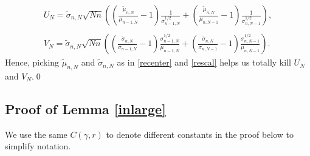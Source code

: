 \documentclass[11pt]{article}
\numberwithin{equation}{section}%
\numberwithin{theorem}{section}
\begin{document}
\begin{equation*}
\begin{array}{cc}
      U_N=\tilde{\sigma}_{n,N}\sqrt{Nn}\left(\left(\frac{\tilde{\mu}_{n,N}}{\mu_{n-1,N}}-1\right)\frac{1}{\sigma_{n-1,N}^{1/2}}+\left(\frac{\tilde{\mu}_{n,N}}{\mu_{n,N-1}}-1\right)\frac{1}{\sigma_{n,N-1}^{1/2}}\right),\\
      \\
        V_N=\tilde{\sigma}_{n,N}\sqrt{Nn}\left(\left(\frac{\tilde{\sigma}_{n,N}}{\sigma_{n-1,N}}-1\right)\frac{\sigma_{n-1,N}^{1/2}}{\mu_{n-1,N}}+\left(\frac{\tilde{\sigma}_{n,N}}{\sigma_{n,N-1}}-1\right)\frac{\sigma_{n,N-1}^{1/2}}{\mu_{n,N-1}}\right).
\end{array}
\end{equation*}
Hence, picking $\tilde{\mu}_{n,N}$ and $\tilde{\sigma}_{n,N}$ as in \eqref{recenter} and \eqref{rescal} helps us totally kill $U_N$ and $V_N$.\qed

\subsection{Proof of Lemma \ref{inlarge}}\label{P4inlarge}
    We use the same $C(\gamma,r)$ to denote different constants in the proof below to simplify notation.
\end{document}
